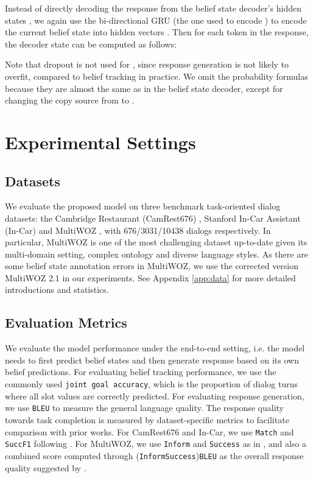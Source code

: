 \documentclass[11pt,a4paper]{article}
\begin{document}
	Instead of directly decoding the response from the belief state decoder's hidden states \cite{lei2018sequicity}, 
	we again use the bi-directional GRU (the one used to encode ) to encode the current belief state  into hidden vectors . Then for each token  in the response, the decoder state  can be computed as follows:
	
	Note that dropout is not used for , since response generation is not likely to overfit, compared to belief tracking in practice.  
	We omit the probability formulas because they are almost the same as in the belief state decoder, except for changing the copy source from  to . 
	
\section{Experimental Settings}
\subsection{Datasets}
	We evaluate the proposed model on three benchmark task-oriented dialog datasets: the Cambridge Restaurant (CamRest676) \cite{wen2017a}, Stanford In-Car Assistant (In-Car) \cite{eric2017key} and MultiWOZ \cite{budzianowski2018multiwoz}, with 676/3031/10438 dialogs respectively. In particular, MultiWOZ is one of the most challenging dataset up-to-date given its multi-domain setting, complex ontology and diverse language styles. As there are some belief state annotation errors in MultiWOZ, we use the corrected version MultiWOZ 2.1 \cite{eric2019multiwoz} in our experiments. See Appendix \ref{app:data} for more detailed introductions and statistics.
	
\subsection{Evaluation Metrics}
We evaluate the model performance under the end-to-end setting, i.e. the model needs to first predict belief states and then generate response based on its own belief predictions. For evaluating belief tracking performance, we use the commonly used \texttt{joint goal accuracy}, which is the proportion of dialog turns where all slot values are correctly predicted. For evaluating response generation, we use \texttt{BLEU} \cite{papineni2002bleu} to measure the general language quality. The response quality towards task completion is measured by dataset-specific metrics to facilitate comparison with prior works. For CamRest676 and In-Car, we use \texttt{Match} and \texttt{SuccF1} following \citet{lei2018sequicity}. 
For MultiWOZ, we use \texttt{Inform} and \texttt{Success} as in \citet{budzianowski2018multiwoz}, and also a combined score computed through (\texttt{Inform}\texttt{Success})\texttt{BLEU} as the overall response quality suggested by \citet{mehri2019structured}. 
	
\end{document}
